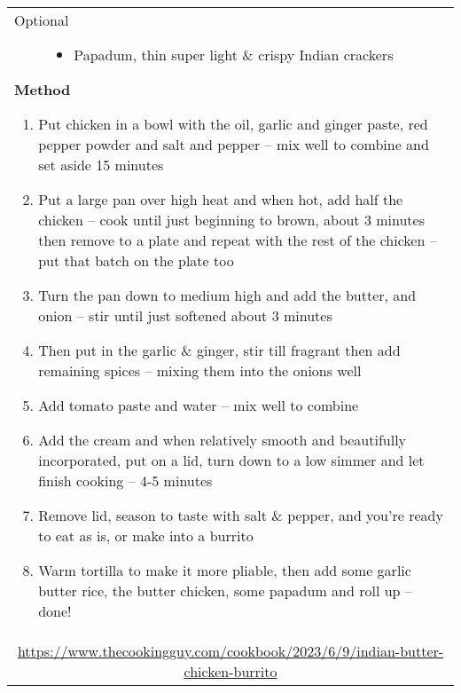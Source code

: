 \documentclass[../cookbook]{subfiles}
\begin{document}
\begin{tabular}{l}
\begin{minipage}[t]{0.35\textwidth}
\begin{description}
      \item[Optional]\hfill
        \begin{itemize}\raggedright\small\sffamily
          \item Papadum, thin super light \& crispy Indian crackers
        \end{itemize}
    \end{description}
  \end{minipage}
  \qquad
  \begin{minipage}[t]{0.55\textwidth}\raggedright\sffamily\small
    {\sffamily\bfseries Method}\vspace{0.5ex}
    \begin{enumerate}\raggedright\small\sffamily
      \item Put chicken in a bowl with the oil, garlic and ginger paste,
        red pepper powder and salt and pepper – mix well to combine and set
        aside 15 minutes
      \item Put a large pan over high heat and when hot, add half the
        chicken – cook until just beginning to brown, about 3 minutes then
        remove to a plate and repeat with the rest of the chicken – put
        that batch on the plate too
      \item Turn the pan down to medium high and add the butter, and
        onion – stir until just softened about 3 minutes
      \item Then put in the garlic \& ginger, stir till fragrant then add
        remaining spices – mixing them into the onions well
      \item Add tomato paste and water – mix well to combine
      \item Add the cream and when relatively smooth and beautifully
        incorporated, put on a lid, turn down to a low simmer and let
        finish cooking – 4-5 minutes
      \item Remove lid, season to taste with salt \& pepper, and you’re
        ready to eat as is, or make into a burrito
      \item Warm tortilla to make it more pliable, then add some garlic
        butter rice, the butter chicken, some papadum and roll up – done!
    \end{enumerate}
  \end{minipage} \vspace{3ex}\\
  \multicolumn{1}{c}{\small\ttfamily
  \url{https://www.thecookingguy.com/cookbook/2023/6/9/indian-butter-chicken-burrito}} \\
\end{tabular}
\end{document}
